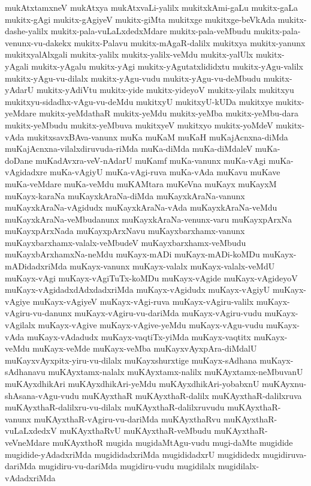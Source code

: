 {mukAtxtamxneV
mukAtxya
mukAtxvaLi-yalilx
mukitxkAmi-gaLu
mukitx-gaLa
mukitx-gAgi
mukitx-gAgiyeV
mukitx-giMta
mukitxge
mukitxge-beVkAda
mukitx-dashe-yalilx
mukitx-pala-vuLaLxdedxMdare
mukitx-pala-veMbudu
mukitx-pala-venunx-vu-dakekx
mukitx-Palavu
mukitx-mAgaR-dalilx
mukitxya
mukitx-yanunx
mukitxyalAlxgali
mukitx-yalilx
mukitx-yalilx-veMdu
mukitx-yalUlx
mukitx-yAgali
mukitx-yAgalu
mukitx-yAgi
mukitx-yAgutatxlididxtu
mukitx-yAgu-valilx
mukitx-yAgu-vu-dilalx
mukitx-yAgu-vudu
mukitx-yAgu-vu-deMbudu
mukitx-yAdarU
mukitx-yAdiVtu
mukitx-yide
mukitx-yideyoV
mukitx-yilalx
mukitxyu
mukitxyu-sidadhx-vAgu-vu-deMdu
mukitxyU
mukitxyU-kUDa
mukitxye
mukitx-yeMdare
mukitx-yeMdathaR
mukitx-yeMdu
mukitx-yeMba
mukitx-yeMbu-dara
mukitx-yeMbudu
mukitx-yeMbuva
mukitxyeV
mukitxyo
mukitx-yoMdeV
mukitx-vAda
mukitxsavxBAva-vanunx
muKa
muKaM
muKaH
muKajAcnxna-diMda
muKajAcnxna-vilalxdiruvuda-riMda
muKa-diMda
muKa-diMdaleV
muKa-doDane
muKadAvxra-veV-nAdarU
muKamf
muKa-vanunx
muKa-vAgi
muKa-vAgidadxre
muKa-vAgiyU
muKa-vAgi-ruva
muKa-vAda
muKavu
muKave
muKa-veMdare
muKa-veMdu
muKAMtara
muKeVna
muKayx
muKayxM
muKayx-karaNa
muKayxkAraNa-diMda
muKayxkAraNa-vanunx
muKayxkAraNa-vAgidudx
muKayxkAraNa-vAda
muKayxkAraNa-veMdu
muKayxkAraNa-veMbudanunx
muKayxkAraNa-venunx-varu
muKayxpArxNa
muKayxpArxNada
muKayxpArxNavu
muKayxbarxhamx-vanunx
muKayxbarxhamx-valalx-veMbudeV
muKayxbarxhamx-veMbudu
muKayxbArxhamxNa-neMdu
muKayx-mADi
muKayx-mADi-koMDu
muKayx-mADidadxriMda
muKayx-vanunx
muKayx-valalx
muKayx-valalx-veMdU
muKayx-vAgi
muKayx-vAgiTuTx-koMDu
muKayx-vAgide
muKayx-vAgideyoV
muKayx-vAgidadxdAdxdadxriMda
muKayx-vAgidudx
muKayx-vAgiyU
muKayx-vAgiye
muKayx-vAgiyeV
muKayx-vAgi-ruva
muKayx-vAgiru-valilx
muKayx-vAgiru-vu-danunx
muKayx-vAgiru-vu-dariMda
muKayx-vAgiru-vudu
muKayx-vAgilalx
muKayx-vAgive
muKayx-vAgive-yeMdu
muKayx-vAgu-vudu
muKayx-vAda
muKayx-vAdadudx
muKayx-vaqtiTx-yiMda
muKayx-vaqtitx
muKayx-veMdu
muKayx-veMde
muKayx-veMba
muKayxvAyxpAra-diMdalU
muKayxvAyxpitx-yiru-vu-dilalx
muKayxshurxtige
muKayx-sAdhana
muKayx-sAdhanavu
muKAyxtamx-nalalx
muKAyxtamx-nalilx
muKAyxtamx-neMbuvanU
muKAyxdhikAri
muKAyxdhikAri-yeMdu
muKAyxdhikAri-yobabxnU
muKAyxnu-shAsana-vAgu-vudu
muKAyxthaR
muKAyxthaR-dalilx
muKAyxthaR-dalilxruva
muKAyxthaR-dalilxru-vu-dilalx
muKAyxthaR-dalilxruvudu
muKAyxthaR-vanunx
muKAyxthaR-vAgiru-vu-dariMda
muKAyxthaRvu
muKAyxthaR-vuLaLxdedxV
muKAyxthaRvU
muKAyxthaR-veMbudu
muKAyxthaR-veVneMdare
muKAyxthoR
mugida
mugidaMtAgu-vudu
mugi-daMte
mugidide
mugidide-yAdadxriMda
mugididadxriMda
mugididadxrU
mugididedx
mugidiruva-dariMda
mugidiru-vu-dariMda
mugidiru-vudu
mugidilalx
mugidilalx-vAdadxriMda
}
